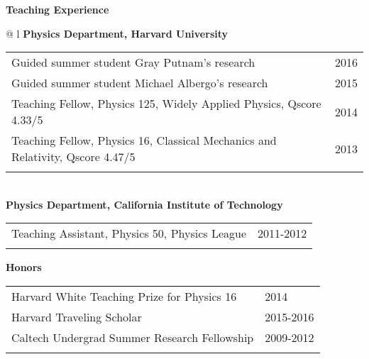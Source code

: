 \documentclass[letterpaper,11pt,oneside]{article}
\begin{document}
\raggedright
\textbf{\Large{Teaching Experience}} \\
\vspace{-0.5cm}
 \normalsize
\begin{flushleft}
\hspace{1cm}
 \begin{tabular}{@{} l}
    \textbf{Physics Department, Harvard University} \\ 
    \begin{tabular}{@{} l l }
 Guided summer student Gray Putnam's research & 2016\\
 Guided summer student Michael Albergo's research & 2015\\
 Teaching Fellow, Physics 125, Widely Applied Physics, Qscore 4.33/5  & 2014\\
 Teaching Fellow, Physics 16, Classical Mechanics and Relativity, Qscore 4.47/5 & 2013\\
    \hspace{0.8\linewidth} & \hspace{0.1\linewidth} \\
     \end{tabular}
     \\
     \textbf{Physics Department, California Institute of Technology} \\
     \begin{tabular}{@{} l l }
 Teaching Assistant, Physics 50, Physics League & 2011-2012\\
    \hspace{0.8\linewidth} & \hspace{0.1\linewidth} \\
      \end{tabular}
      \end{tabular}
\end{flushleft}

\raggedright
 \textbf{\Large{Honors}} \\
\vspace{-0.5cm}
 \normalsize
\begin{flushleft}
\hspace{1cm}
\begin{tabular}{@{} l l }
 Harvard White Teaching Prize for Physics 16 & 2014\\
 Harvard Traveling Scholar & 2015-2016\\
 Caltech Undergrad Summer Research Fellowship & 2009-2012\\
    \hspace{0.8\linewidth} & \hspace{0.1\linewidth} \\
 \end{tabular}
\end{flushleft}
\end{document}
